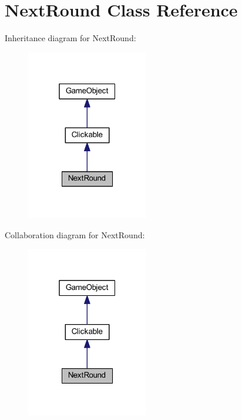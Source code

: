 \hypertarget{class_next_round}{\section{Next\+Round Class Reference}
\label{class_next_round}
}


Inheritance diagram for Next\+Round\+:\nopagebreak
\begin{figure}[H]
\begin{center}
\leavevmode
\includegraphics[width=151pt]{class_next_round__inherit__graph}
\end{center}
\end{figure}


Collaboration diagram for Next\+Round\+:\nopagebreak
\begin{figure}[H]
\begin{center}
\leavevmode
\includegraphics[width=151pt]{class_next_round__coll__graph}
\end{center}
\end{figure}
